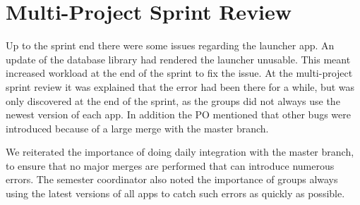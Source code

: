 \section{Multi-Project Sprint Review}\label{sec:s3_multiprj_review}
Up to the sprint end there were some issues regarding the launcher app. An update of the database library had rendered the launcher unusable. This meant increased workload at the end of the sprint to fix the issue. At the multi-project sprint review it was explained that the error had been there for a while, but was only discovered at the end of the sprint, as the \gui groups did not always use the newest version of each app. In addition the \db PO mentioned that other bugs were introduced because of a large merge with the master branch.

We reiterated the importance of doing daily integration with the master branch, to ensure that no major merges are performed that can introduce numerous errors. The semester coordinator also noted the importance of \gui groups always using the latest versions of all apps to catch such errors as quickly as possible.